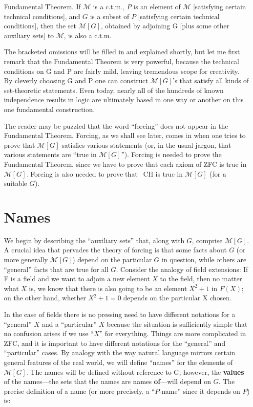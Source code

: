 \documentclass[10pt]{article}
\begin{document}
Fundamental Theorem. If $\mathcal{M}$ is a c.t.m., $P$ is an element of $\mathcal{M}$ [satisfying certain technical conditions], and $G$ is a subset of $P$ [satisfying certain technical conditions], then the set $\mathcal{M}[G]$, obtained by adjoining G [plus some other auxiliary sets] to $\mathcal M$, is also a c.t.m.

The bracketed omissions will be filled in and explained shortly, but let me first remark that the Fundamental Theorem is very powerful, because the technical conditions on G and P are fairly mild, leaving tremendous scope for creativity. By cleverly choosing G and P one can construct $\mathcal{M}[G]$'s that satisfy all kinds of set-theoretic statements. Even today, nearly all of the hundreds of known independence results in logic are ultimately based in one way or another on this one fundamental construction.

The reader may be puzzled that the word ``forcing'' does not appear in the Fundamental Theorem. Forcing, as we shall see later, comes in when one tries to prove that $\mathcal{M}[G]$ satisfies various statements (or, in the usual jargon, that various statements are ``true in $\mathcal{M}[G]$''). Forcing is needed to prove the Fundamental Theorem, since we have to prove that each axiom of ZFC is true in $\mathcal{M}[G]$. Forcing is also needed to prove that ~CH is true in $\mathcal{M}[G]$ (for a suitable $G$).


\section{Names}

We begin by describing the ``auxiliary sets'' that, along with $G$, comprise $\mathcal M[G]$. A crucial idea that pervades the theory of forcing is that some facts about $G$ (or more generally $\mathcal{M}[G]$) depend on the particular $G$ in question, while others are ``general'' facts that are true for all $G$. Consider the analogy of field extensions: If F is a field and we want to adjoin a new element $X$ to the field, then no matter what $X$ is, we know that there is also going to be an element $X^2 + 1$ in $F(X)$; on the other hand, whether $X^2 + 1 = 0$ depends on the particular X chosen.

In the case of fields there is no pressing need to have different notations for a ``general'' $X$ and a ``particular'' $X$ because the situation is sufficiently simple that no confusion arises if we use ``$X$'' for everything. Things are more complicated in ZFC, and it is important to have different notations for the ``general'' and ``particular'' cases. By analogy with the way natural language mirrors certain general features of the real world, we will define ``names'' for the elements of $\mathcal{M}[G]$. The names will be defined without reference to G; however, the \textbf{values} of the names---the sets that the names are names \textbf{of}---will depend on $G$. The precise definition of a name (or more precisely, a ``$P$-name'' since it depends on $P$) is:
\end{document}
